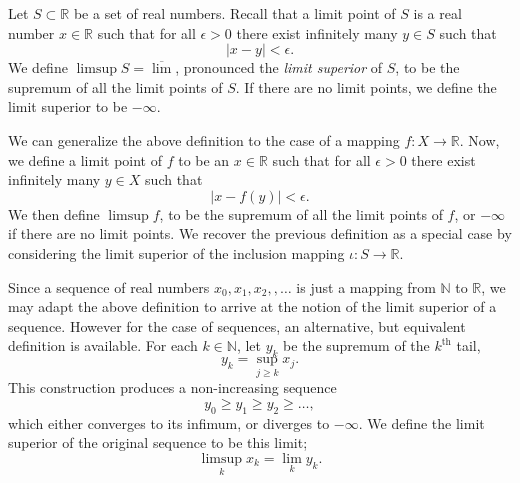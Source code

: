 \documentclass{article}
\newcommand{\reals}{\mathbb{R}}
\newcommand{\natnums}{\mathbb{N}}
\newcommand{\supth}{^{\text{th}}}
\begin{document}
Let $S\subset\reals$ be a set of real numbers.  Recall that a limit
point of $S$ is a real number $x\in\reals$ such that for all
$\epsilon>0$ there exist infinitely many $y\in S$ such that
$$\vert x-y\vert <\epsilon.$$
We define $\limsup S=\overline{\lim}$, pronounced the
{\em limit superior} of $S$, to be the supremum of all the limit
points of $S$.  If there are no limit points, we define the limit
superior to be $-\infty$.  

We can generalize the above definition to the case of a 
 mapping $f:X\to\reals$. Now, we define a limit point of 
 $f$ to be an $x\in \reals$ such that for all
$\epsilon>0$ there exist infinitely many $y\in X$ such that
$$\vert x-f(y)\vert <\epsilon.$$
We then define $\limsup f$, to be the
supremum of all the limit points of $f$, or $-\infty$ if there are no
limit points.  We recover the previous definition as a special case by
considering the limit superior of the inclusion mapping $\iota: S\to
\reals$.


Since a sequence of real numbers $x_0, x_1, x_2, ,\ldots$ is just a
mapping from $\natnums$ to $\reals$, we may adapt the above definition
to arrive at the notion of the limit superior of a sequence.  However
for the case of sequences, an alternative, but equivalent definition
is available.  For each $k\in\natnums$, let $y_k$ be the supremum of
the $k\supth$ tail,
$$y_k = \sup_{j\geq k} x_j .$$
This construction produces a
non-increasing sequence
$$y_0 \geq y_1 \geq y_2 \geq \ldots,$$
which either converges to its infimum, or diverges to $-\infty$.
We define the limit superior of the original sequence to be this limit;
$$\limsup_{k} x_k = \lim_k y_k.$$
\end{document}
